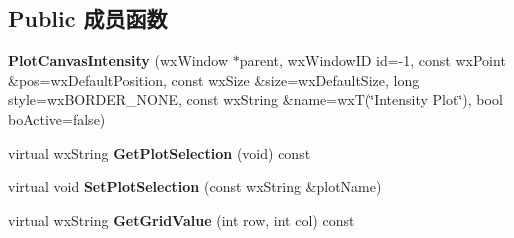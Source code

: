 \subsection*{Public 成员函数}
\begin{DoxyCompactItemize}
\item 
\hypertarget{class_plot_canvas_intensity_aaf6cbcd73e9a03357f252a5a14fff09d}{{\bfseries Plot\+Canvas\+Intensity} (wx\+Window $\ast$parent, wx\+Window\+I\+D id=-\/1, const wx\+Point \&pos=wx\+Default\+Position, const wx\+Size \&size=wx\+Default\+Size, long style=wx\+B\+O\+R\+D\+E\+R\+\_\+\+N\+O\+N\+E, const wx\+String \&name=wx\+T(\char`\"{}Intensity Plot\char`\"{}), bool bo\+Active=false)}\label{class_plot_canvas_intensity_aaf6cbcd73e9a03357f252a5a14fff09d}

\item 
\hypertarget{class_plot_canvas_intensity_a2524d49d5097febed9bd2556a4a9dc7c}{virtual wx\+String {\bfseries Get\+Plot\+Selection} (void) const }\label{class_plot_canvas_intensity_a2524d49d5097febed9bd2556a4a9dc7c}

\item 
\hypertarget{class_plot_canvas_intensity_acc36ae015f4f221319d8f15a8c5b11b7}{virtual void {\bfseries Set\+Plot\+Selection} (const wx\+String \&plot\+Name)}\label{class_plot_canvas_intensity_acc36ae015f4f221319d8f15a8c5b11b7}

\item 
\hypertarget{class_plot_canvas_intensity_aac3099fceb6ed640a9793b75352b4cc0}{virtual wx\+String {\bfseries Get\+Grid\+Value} (int row, int col) const }\label{class_plot_canvas_intensity_aac3099fceb6ed640a9793b75352b4cc0}

\end{DoxyCompactItemize}
